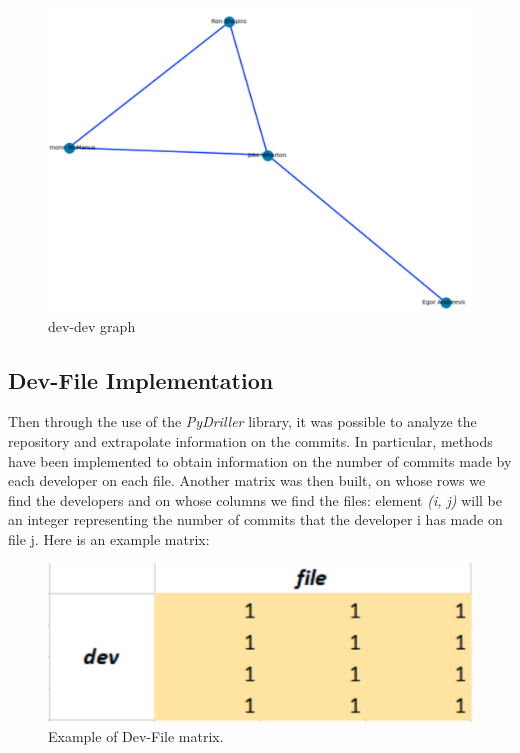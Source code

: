 \documentclass[sigconf]{acmart}
\begin{document}
\begin{figure}[h]
  \centering
  \includegraphics[width=\linewidth]{img_8}
  \caption{dev-dev graph}
  \Description{}
\end{figure}

\subsection{Dev-File Implementation}
Then through the use of the {\itshape PyDriller} library, it was possible to analyze the repository and extrapolate information on the commits. In particular, methods have been implemented to obtain information on the number of commits made by each developer on each file.
Another matrix was then built, on whose rows we find the developers and on whose columns we find the files: element {\itshape (i, j)} will be an integer representing the number of commits that the developer i has made on file j. Here is an example matrix:

\begin{figure}[h]
  \centering
  \includegraphics[width=\linewidth]{img_3}
  \caption{Example of Dev-File matrix.}
  \Description{}
\end{figure}
\end{document}
